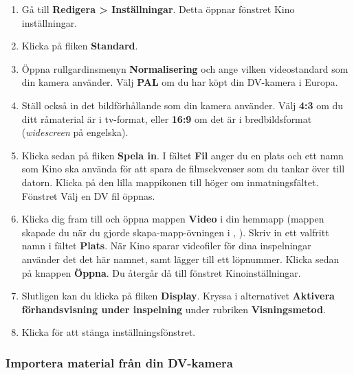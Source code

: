 \documentclass[a4paper,final]{memoir} %
\begin{document}
\begin{enumerate}

\item Gå till \textbf{Redigera \textgreater{} Inställningar}. Detta öppnar fönstret Kino inställningar.

\item Klicka på fliken \textbf{Standard}.

\item Öppna rullgardinsmenyn \textbf{Normalisering} och ange vilken videostandard som din kamera använder. Välj \textbf{PAL} om du har köpt din DV-kamera i Europa.

\item Ställ också in det bildförhållande som din kamera använder. Välj \textbf{4:3} om du ditt råmaterial är i tv-format, eller \textbf{16:9} om det är i bredbildsformat (\textit{widescreen} på engelska).

\item Klicka sedan på fliken \textbf{Spela in}. I fältet \textbf{Fil} anger du en plats och ett namn som Kino ska använda för att spara de filmsekvenser som du tankar över till datorn. Klicka på den lilla mappikonen till höger om inmatningsfältet. Fönstret Välj en DV fil öppnas. 

\item Klicka dig fram till och öppna mappen \textbf{Video} i din hemmapp (mappen skapade du när du gjorde skapa-mapp-övningen i , ). Skriv in ett valfritt namn i fältet \textbf{Plats}. När Kino sparar videofiler för dina inspelningar använder det det här namnet, samt lägger till ett löpnummer. Klicka sedan på knappen \textbf{Öppna}. Du återgår då till fönstret Kinoinställningar.

\item Slutligen kan du klicka på fliken \textbf{Display}. Kryssa i alternativet \textbf{Aktivera förhandsvisning under inspelning} under rubriken \textbf{Visningsmetod}.

\item Klicka \xok{} för att stänga inställningsfönstret.

\end{enumerate}


\subsubsection{Importera material från din DV-kamera}
\end{document}
